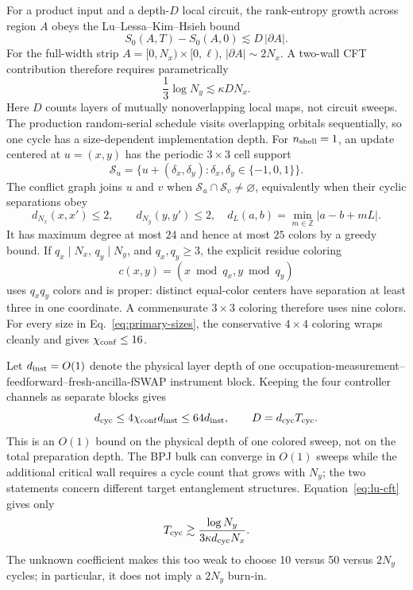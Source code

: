 \documentclass[aps,prx,onecolumn,nofootinbib,superscriptaddress,longbibliography]{revtex4-2}
\begin{document}
For a product input and a depth-$D$ local circuit, the rank-entropy growth across region $A$
obeys the Lu--Lessa--Kim--Hsieh bound~\cite{LuLessaKimHsieh2022}
\begin{equation}
 S_0(A,T)-S_0(A,0)\lesssim D\,|\partial A|.
 \label{eq:lu-bound}
\end{equation}
For the full-width strip $A=[0,N_x)\times[0,\ell)$,
$|\partial A|\sim2N_x$.  A two-wall CFT contribution therefore requires parametrically
\begin{equation}
 \frac13\log N_y\lesssim \kappa D N_x.
 \label{eq:lu-cft}
\end{equation}
Here $D$ counts layers of mutually nonoverlapping local maps, not circuit sweeps.  The
production random-serial schedule visits overlapping orbitals sequentially, so one cycle
has a size-dependent implementation depth.  For $n_{\rm shell}=1$, an update centered at
$u=(x,y)$ has the periodic $3\times3$ cell support
\begin{equation}
 \mathcal S_u=\{u+(\delta_x,\delta_y):\delta_x,\delta_y\in\{-1,0,1\}\}.
\end{equation}
The conflict graph joins $u$ and $v$ when $\mathcal S_u\cap\mathcal S_v\ne\varnothing$,
equivalently when their cyclic separations obey
\begin{equation}
 d_{N_x}(x,x')\le2,\qquad d_{N_y}(y,y')\le2,
 \quad
 d_L(a,b)=\min_{m\in\mathbb Z}|a-b+mL|.
\end{equation}
It has maximum degree at most $24$ and hence at most $25$ colors by a greedy bound.  If
$q_x\mid N_x$, $q_y\mid N_y$, and $q_x,q_y\ge3$, the explicit residue coloring
\begin{equation}
 c(x,y)=(x\bmod q_x,y\bmod q_y)
 \label{eq:residue-coloring}
\end{equation}
uses $q_xq_y$ colors and is proper: distinct equal-color centers have separation at least
three in one coordinate.  A commensurate $3\times3$ coloring therefore uses nine colors.
For every size in Eq.~\eqref{eq:primary-sizes}, the conservative $4\times4$ coloring wraps
cleanly and gives $\chi_{\rm conf}\le16$.

Let $d_{\rm inst}=O(1)$ denote the physical layer depth of one
occupation-measurement--feedforward--fresh-ancilla-fSWAP instrument block.  Keeping the four
controller channels as separate blocks gives
\begin{equation}
 d_{\rm cyc}\le4\chi_{\rm conf}d_{\rm inst}\le64d_{\rm inst},
 \qquad D=d_{\rm cyc}T_{\rm cyc}.
 \label{eq:colored-depth}
\end{equation}
This is an $O(1)$ bound on the physical depth of one colored sweep, not on the total
preparation depth.  The BPJ bulk can converge in $O(1)$ sweeps while the additional
critical wall requires a cycle count that grows with $N_y$; the two statements concern
different target entanglement structures.
Equation~\eqref{eq:lu-cft} gives only
\begin{equation}
 T_{\rm cyc}\gtrsim
 \frac{\log N_y}{3\kappa d_{\rm cyc}N_x}.
 \label{eq:lu-cycles}
\end{equation}
The unknown coefficient makes this too weak to choose 10 versus 50 versus $2N_y$ cycles;
in particular, it does not imply a $2N_y$ burn-in.
\end{document}
